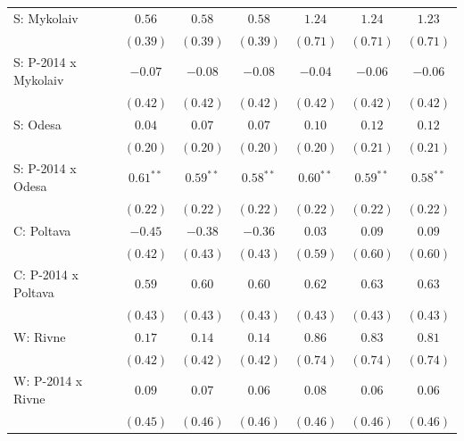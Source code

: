 \begin{table}
\begin{center}
\begin{small}
\begin{tabular}{l c c c c c c}
S: Mykolaiv                 & $0.56$        & $0.58$        & $0.58$        & $1.24$       & $1.24$       & $1.23$       \\
                            & $(0.39)$      & $(0.39)$      & $(0.39)$      & $(0.71)$     & $(0.71)$     & $(0.71)$     \\
S: P-2014 x Mykolaiv        & $-0.07$       & $-0.08$       & $-0.08$       & $-0.04$      & $-0.06$      & $-0.06$      \\
                            & $(0.42)$      & $(0.42)$      & $(0.42)$      & $(0.42)$     & $(0.42)$     & $(0.42)$     \\
S: Odesa                    & $0.04$        & $0.07$        & $0.07$        & $0.10$       & $0.12$       & $0.12$       \\
                            & $(0.20)$      & $(0.20)$      & $(0.20)$      & $(0.20)$     & $(0.21)$     & $(0.21)$     \\
S: P-2014 x Odesa           & $0.61^{**}$   & $0.59^{**}$   & $0.58^{**}$   & $0.60^{**}$  & $0.59^{**}$  & $0.58^{**}$  \\
                            & $(0.22)$      & $(0.22)$      & $(0.22)$      & $(0.22)$     & $(0.22)$     & $(0.22)$     \\
C: Poltava                  & $-0.45$       & $-0.38$       & $-0.36$       & $0.03$       & $0.09$       & $0.09$       \\
                            & $(0.42)$      & $(0.43)$      & $(0.43)$      & $(0.59)$     & $(0.60)$     & $(0.60)$     \\
C: P-2014 x Poltava         & $0.59$        & $0.60$        & $0.60$        & $0.62$       & $0.63$       & $0.63$       \\
                            & $(0.43)$      & $(0.43)$      & $(0.43)$      & $(0.43)$     & $(0.43)$     & $(0.43)$     \\
W: Rivne                    & $0.17$        & $0.14$        & $0.14$        & $0.86$       & $0.83$       & $0.81$       \\
                            & $(0.42)$      & $(0.42)$      & $(0.42)$      & $(0.74)$     & $(0.74)$     & $(0.74)$     \\
W: P-2014 x Rivne           & $0.09$        & $0.07$        & $0.06$        & $0.08$       & $0.06$       & $0.06$       \\
                            & $(0.45)$      & $(0.46)$      & $(0.46)$      & $(0.46)$     & $(0.46)$     & $(0.46)$     \\

\end{tabular}
\end{small}
\end{center}
\end{table}
